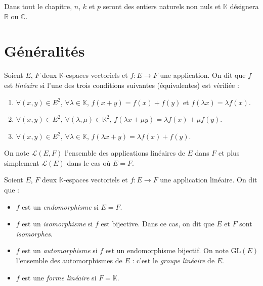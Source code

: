 \documentclass[french,11pt,twoside]{VcCours}
\renewcommand{\trou}[1]{{\color{blue}#1}}
\begin{document}

\tableofcontents
\separationTitre

Dans tout le chapitre, $n$, $k$ et $p$ seront des entiers naturels non nuls et $\mathbb{K}$ désignera $\mathbb{R}$ ou $\mathbb{C}$.
 
 \section{Généralités}
 
 \begin{Definition}{} Soient $E$, $F$ deux $\mathbb{K}$-espaces vectoriels et $f : E \rightarrow F$ une application. On dit que $f$ est \emph{linéaire} si l'une des trois conditions suivantes (équivalentes) est vérifiée :

\begin{enumerate}
\item $\forall (x,y) \in E^2$, $\forall \lambda \in \mathbb{K}$, \trou{$f(x+y) = f(x)+f(y)$ et $f(\lambda x) = \lambda f(x)$.}
\item $\forall (x,y) \in E^2$, $\forall (\lambda,\mu) \in \mathbb{K}^2$, \trou{$f(\lambda x + \mu y) = \lambda f(x) + \mu f(y)$. }
\item $\forall (x,y) \in E^2$, $\forall \lambda \in \mathbb{K}$, \trou{$f(\lambda x + y) = \lambda f(x) +  f(y)$. }
\end{enumerate}
On note $\mathcal{L}(E,F)$ l'ensemble des applications linéaires de $E$ dans $F$ et plus simplement $\mathcal{L}(E)$ dans le cas où $E=F$.
\end{Definition}

\begin{Definition}{} Soient $E$, $F$ deux $\mathbb{K}$-espaces vectoriels et $f : E \rightarrow F$ une application linéaire. On dit que :

\begin{itemize}
\item $f$ est un \emph{endomorphisme} si \trou{$E=F$.}
\item $f$ est un \emph{isomorphisme} si $f$ est bijective. Dans ce cas, on dit que $E$ et $F$ sont \emph{isomorphes}.
\item $f$ est un \emph{automorphisme} si $f$ est un endomorphisme bijectif. On note $\textrm{GL}(E)$ l'ensemble des automorphismes de $E$ : c'est le \emph{groupe linéaire} de $E$.
\item $f$ est une \emph{forme linéaire} si \trou{$F = \mathbb{K}$.}
\end{itemize}
\end{Definition}
\end{document}

